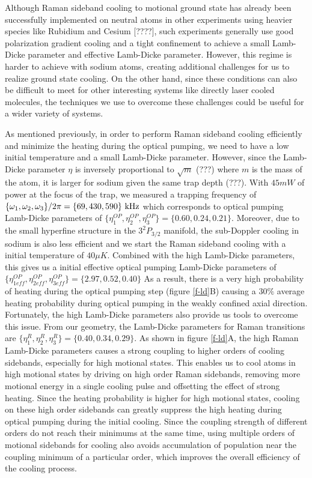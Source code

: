 \documentclass[aps,prl,twocolumn,groupedaddress]{revtex4-1}
\begin{document}
Although Raman sideband cooling to motional ground state has already been successfully
implemented on neutral atoms in other experiments using heavier species like Rubidium
\cite{Thompson2013,Kaufman2012}
and Cesium [????], such experiments generally use good polarization gradient cooling
and a tight confinement to achieve a small Lamb-Dicke parameter and effective Lamb-Dicke parameter.
However, this regime is harder to achieve with sodium atoms, creating additional challenges for
us to realize ground state cooling. On the other hand, since these conditions can also be difficult
to meet for other interesting systems like directly laser cooled molecules, the techniques we
use to overcome these challenges could be useful for a wider variety of systems.

As mentioned previously, in order to perform Raman sideband cooling efficiently and
minimize the heating during the optical pumping, we need to have a low initial temperature and
a small Lamb-Dicke parameter. However, since the Lamb-Dicke parameter $\eta$ is inversely
proportional to $\sqrt{m}$ (???) where $m$ is the mass of the atom, it is larger for sodium
given the same trap depth (???).
With $45mW$ of power at the focus of the trap, we measured a trapping frequency of
$\{\omega_1,\omega_2,\omega_3\}/2\pi = \{69, 430, 590\}\ \text{\text{kHz}}$
which corresponds to optical pumping Lamb-Dicke parameters of
$\{\eta^{OP}_1,\eta^{OP}_2,\eta^{OP}_3\} = \{0.60, 0.24, 0.21\}$.
Moreover, due to the small hyperfine structure in the $3^2P_{3/2}$ manifold,
the sub-Doppler cooling in sodium is also less efficient and we start the
Raman sideband cooling with a initial temperature of $40\mu K$. Combined with the high Lamb-Dicke
parameters, this gives us a initial effective optical pumping Lamb-Dicke parameters of
$\{\eta^{OP}_{1eff},\eta^{OP}_{2eff},\eta^{OP}_{3eff}\} = \{2.97, 0.52, 0.40\}$
As a result, there is a very high probability of heating during the optical pumping step
(figure \ref{f-ld}B) causing a $30\%$ average heating probability during optical pumping
in the weakly confined axial direction. Fortunately, the high Lamb-Dicke parameters also
provide us tools to overcome this issue. From our geometry, the Lamb-Dicke parameters for
Raman transitions are $\{\eta^R_{1},\eta^R_{2},\eta^R_{3}\} = \{0.40, 0.34, 0.29\}$. As shown in
figure \ref{f-ld}A, the high Raman Lamb-Dicke parameters causes a strong coupling to higher orders
of cooling sidebands, especially for high motional states.
This enables us to cool atoms in high motional states by driving on high order Raman sidebands,
removing more motional energy in a single cooling pulse and offsetting the effect of
strong heating. Since the heating probability is higher for high motional states,
cooling on these high order sidebands can greatly suppress the high heating during
optical pumping during the initial cooling. Since the coupling strength of different orders
do not reach their minimums at the same time, using multiple orders of motional sidebands
for cooling also avoids accumulation of population near the coupling minimum of a particular
order, which improves the overall efficiency of the cooling process.
\end{document}
